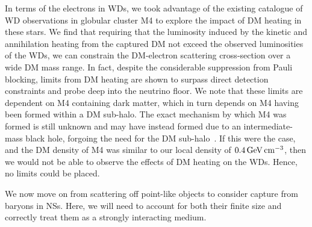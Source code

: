 In terms of the electrons in WDs, we took advantage of the existing catalogue of WD observations in globular cluster M4 to explore the impact of DM heating in these stars. We find that requiring that the luminosity induced by the kinetic and annihilation heating from the captured DM not exceed the observed luminosities of the WDs, we can constrain the DM-electron scattering cross-section over a wide DM mass range. In fact, despite the considerable suppression from Pauli blocking, limits from DM heating are shown to surpass direct detection constraints and probe deep into the neutrino floor. 
We note that these limits are dependent on M4 containing dark matter, which in turn depends on M4 having been formed within a DM sub-halo. The exact mechanism by which M4 was formed is still unknown and may have instead formed due to an intermediate-mass black hole, forgoing the need for the DM sub-halo~\cite{Vitral:2023zhl_Elusivedarkcentral}. If this were the case, and the DM density of M4 was similar to our local density of $0.4 {\rm \,GeV} {\rm \,cm}^{-3}$, then we would not be able to observe the effects of DM heating on the WDs. Hence, no limits could be placed. 

We now move on from scattering off point-like objects to consider capture from baryons in NSs. Here, we will need to account for both their finite size and correctly treat them as a strongly interacting medium. 